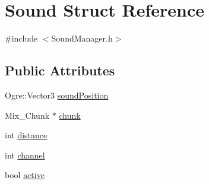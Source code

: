 \hypertarget{structSound}{\section{Sound Struct Reference}
\label{structSound}
}


{\ttfamily \#include $<$Sound\-Manager.\-h$>$}

\subsection*{Public Attributes}
\begin{DoxyCompactItemize}
\item 
Ogre\-::\-Vector3 \hyperlink{structSound_a7032f013c11da2c354a6e41020e170a7}{sound\-Position}
\item 
Mix\-\_\-\-Chunk $\ast$ \hyperlink{structSound_a658d91b8d31c3420cf6106fcb6eaa223}{chunk}
\item 
int \hyperlink{structSound_a259757aea073ec5c56a23955d56bf21b}{distance}
\item 
int \hyperlink{structSound_af3895edf5a39772f1de32cfbfff90909}{channel}
\item 
bool \hyperlink{structSound_aada15bf9ccd1e956b92f5e772134705f}{active}
\end{DoxyCompactItemize}



